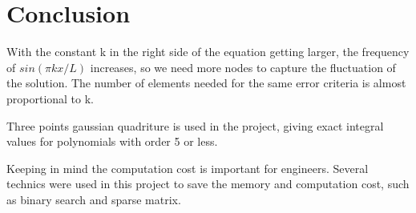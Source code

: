 \documentclass[paper=a4, fontsize=11pt]{article} %
\begin{document}




\section{Conclusion}
With the constant k in the right side of the equation getting larger, the frequency of $sin(\pi k x /L)$ increases, so we need more nodes to capture the fluctuation of the solution. The number of elements needed for the same error criteria is almost proportional to k.

Three points gaussian quadriture is used in the project, giving exact integral values for polynomials with order 5 or less. 

Keeping in mind the computation cost is important for engineers. Several technics were used in this project to save the memory and computation cost, such as binary search and sparse matrix. 
\end{document}
